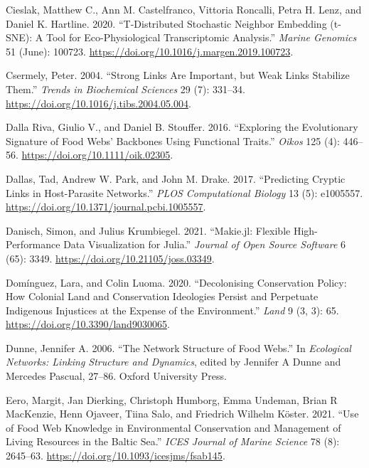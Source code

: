 \documentclass[
  letterpaper,
  DIV=11,
  numbers=noendperiod]{scrartcl}
\newlength{\cslhangindent}
\newlength{\cslentryspacingunit} %
\newenvironment{CSLReferences}[2] %
 {%
  \setlength{\parindent}{0pt}
  \ifodd #1
  \let\oldpar\par
  \def\par{\hangindent=\cslhangindent\oldpar}
  \fi
  \setlength{\parskip}{#2\cslentryspacingunit}
 }%
 {}
\begin{document}
\begin{CSLReferences}{1}{0}
\leavevmode{}%
Cieslak, Matthew C., Ann M. Castelfranco, Vittoria Roncalli, Petra H.
Lenz, and Daniel K. Hartline. 2020. {``T-{Distributed Stochastic
Neighbor Embedding} (t-{SNE}): {A} Tool for Eco-Physiological
Transcriptomic Analysis.''} \emph{Marine Genomics} 51 (June): 100723.
\url{https://doi.org/10.1016/j.margen.2019.100723}.

\leavevmode{}%
Csermely, Peter. 2004. {``Strong Links Are Important, but Weak Links
Stabilize Them.''} \emph{Trends in Biochemical Sciences} 29 (7):
331--34. \url{https://doi.org/10.1016/j.tibs.2004.05.004}.

\leavevmode{}%
Dalla Riva, Giulio V., and Daniel B. Stouffer. 2016. {``Exploring the
Evolutionary Signature of Food Webs' Backbones Using Functional
Traits.''} \emph{Oikos} 125 (4): 446--56.
\url{https://doi.org/10.1111/oik.02305}.

\leavevmode{}%
Dallas, Tad, Andrew W. Park, and John M. Drake. 2017. {``Predicting
Cryptic Links in Host-Parasite Networks.''} \emph{PLOS Computational
Biology} 13 (5): e1005557.
\url{https://doi.org/10.1371/journal.pcbi.1005557}.

\leavevmode{}%
Danisch, Simon, and Julius Krumbiegel. 2021. {``Makie.jl: {Flexible}
High-Performance Data Visualization for {Julia}.''} \emph{Journal of
Open Source Software} 6 (65): 3349.
\url{https://doi.org/10.21105/joss.03349}.

\leavevmode{}%
Domínguez, Lara, and Colin Luoma. 2020. {``Decolonising {Conservation
Policy}: {How Colonial Land} and {Conservation Ideologies Persist} and
{Perpetuate Indigenous Injustices} at the {Expense} of the
{Environment}.''} \emph{Land} 9 (3, 3): 65.
\url{https://doi.org/10.3390/land9030065}.

\leavevmode{}%
Dunne, Jennifer A. 2006. {``The {Network Structure} of {Food Webs}.''}
In \emph{Ecological Networks: {Linking} Structure and Dynamics}, edited
by Jennifer A Dunne and Mercedes Pascual, 27--86. {Oxford University
Press}.

\leavevmode{}%
Eero, Margit, Jan Dierking, Christoph Humborg, Emma Undeman, Brian R
MacKenzie, Henn Ojaveer, Tiina Salo, and Friedrich Wilhelm Köster. 2021.
{``Use of Food Web Knowledge in Environmental Conservation and
Management of Living Resources in the {Baltic Sea}.''} \emph{ICES
Journal of Marine Science} 78 (8): 2645--63.
\url{https://doi.org/10.1093/icesjms/fsab145}.


\end{CSLReferences}
\end{document}
